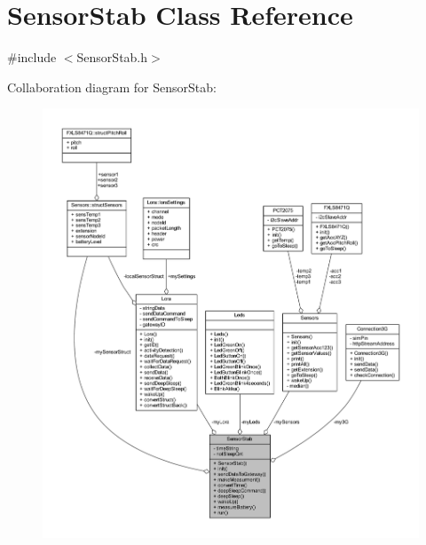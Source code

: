 \hypertarget{class_sensor_stab}{}\section{Sensor\+Stab Class Reference}
\label{class_sensor_stab}


{\ttfamily \#include $<$Sensor\+Stab.\+h$>$}



Collaboration diagram for Sensor\+Stab\+:
\nopagebreak
\begin{figure}[H]
\begin{center}
\leavevmode
\includegraphics[width=350pt]{class_sensor_stab__coll__graph}
\end{center}
\end{figure}
